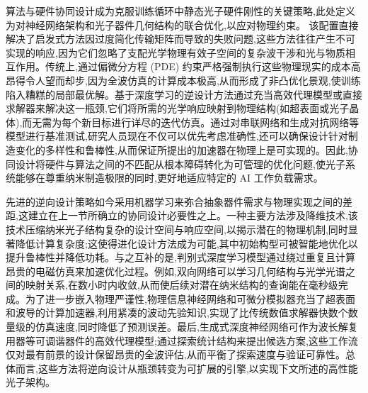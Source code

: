 算法与硬件协同设计成为克服训练循环中静态光子硬件刚性的关键策略,此处定义为对神经网络架构和光子器件几何结构的联合优化,以应对物理约束。\citep{doi_10_1109_dac63849_2025_11133307_892a6228} \citep{s2_c41720a8a362c412dc17bab4c3f329f2ac7c9818_1a5c96e4} 该配置直接解决了启发式方法因过度简化传输矩阵而导致的失败问题,这些方法往往产生不可实现的响应,因为它们忽略了支配光学物理有效子空间的复杂波干涉和光与物质相互作用。传统上,通过偏微分方程 (PDE) 约束严格强制执行这些物理现实的成本高昂得令人望而却步,因为全波仿真的计算成本极高,从而形成了非凸优化景观,使训练陷入糟糕的局部最优解。基于深度学习的逆设计方法通过充当高效代理模型或直接求解器来解决这一瓶颈,它们将所需的光学响应映射到物理结构(如超表面或光子晶体),而无需为每个新目标进行详尽的迭代仿真。通过对串联网络和生成对抗网络等模型进行基准测试,研究人员现在不仅可以优先考虑准确性,还可以确保设计针对制造变化的多样性和鲁棒性,从而保证所提出的加速器在物理上是可实现的。因此,协同设计将硬件与算法之间的不匹配从根本障碍转化为可管理的优化问题,使光子系统能够在尊重纳米制造极限的同时,更好地适应特定的 AI 工作负载需求。\citep{doi_10_48550_arxiv_2505_18377_a6fc9ec3} \citep{doi_10_1364_prj_415960_cf59d95b} \citep{doi_10_29026_oes_2022_210012_27973a69}

先进的逆向设计策略如今采用机器学习来弥合抽象器件需求与物理实现之间的差距,这建立在上一节所确立的协同设计必要性之上。一种主要方法涉及降维技术,该技术压缩纳米光子结构复杂的设计空间与响应空间,以揭示潜在的物理机制,同时显著降低计算复杂度;这使得进化设计方法成为可能,其中初始构型可被智能地优化以提升鲁棒性并降低功耗。与之互补的是,判别式深度学习模型通过绕过重复且计算昂贵的电磁仿真来加速优化过程。例如,双向网络可以学习几何结构与光学光谱之间的映射关系,在数小时内收敛,从而使后续对潜在纳米结构的查询能在毫秒级完成。为了进一步嵌入物理严谨性,物理信息神经网络和可微分模拟器充当了超表面和波导的计算加速器,利用紧凑的波动先验知识,实现了比传统数值求解器快数个数量级的仿真速度,同时降低了预测误差。最后,生成式深度神经网络可作为波长解复用器等可调谐器件的高效代理模型;通过探索统计结构来提出候选方案,这些工作流仅对最有前景的设计保留昂贵的全波评估,从而平衡了探索速度与验证可靠性。总体而言,这些方法将逆向设计从瓶颈转变为可扩展的引擎,以实现下文所述的高性能光子架构。\citep{doi_10_1117_12_2595199_6f40f1c0} \citep{doi_10_1515_nanoph_2021_0660_2d91a441} \citep{doi_10_48550_arxiv_2209_10098_b3bedb78} \citep{doi_10_1109_access_2026_3697666_bd5258a6}

